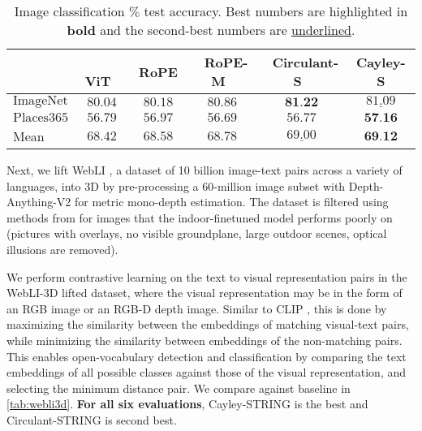 \vspace{-1mm}
\begin{table}[h]
    \centering
    \begin{tabular}{@{} l |@{}c@{} @{}c@{} @{}c@{}| @{}c@{} @{}c@{}}
    \toprule 
         & $\ $ $\ $ ViT $\ $ $\ $& $\ $ RoPE $\ $& $\ $ RoPE\textrm{-}M $\ $ & $\ $ Circulant\textrm{-}S $\ $ & $\ $ Cayley\textrm{-}S \\
         \midrule
        $\mathrm{ImageNet}$ & $80.04$ &  $80.18$ & $80.86$ & $\textbf{81.22}$ & $\underline{81.09}$ \\
        $\mathrm{Places365}$ & $56.79$ & \underline{$56.97$} & $56.69$ & $56.77$ & $\textbf{57.16}$ \\
        \midrule
        Mean & $68.42$ & $68.58$ & $68.78$ & $\underline{69.00}$ & $\textbf{69.12}$ \\
        \bottomrule
    \end{tabular}
    \caption{Image classification $\%$ test accuracy. Best numbers are highlighted in \textbf{bold} and the second-best numbers are \underline{underlined}.}
    \label{tab:img_class}
\vspace{-3mm}
\end{table}
Next, we lift \textrm{WebLI} \citep{chen2023pali}, a dataset of 10 billion image-text pairs across a variety of languages, into 3D by pre-processing a 60-million image subset with Depth-Anything-V2 \citep{yang2024depthv2} for metric mono-depth estimation.
The dataset is filtered using methods from \citep{chen2024spatialvlm} for images that the indoor-finetuned model performs poorly on (pictures with overlays, no visible groundplane, large outdoor scenes, optical illusions are removed). 

We perform contrastive learning on the text to visual representation pairs in the WebLI-3D lifted dataset, where the visual representation may be in the form of an RGB image or an RGB-D depth image.
Similar to CLIP \citep{radford2021clip}, this is done by maximizing the similarity between the embeddings of matching visual-text pairs, while minimizing the similarity between embeddings of the non-matching pairs. 
This enables open-vocabulary detection and classification by comparing the text embeddings of all possible classes against those of the visual representation, and selecting the minimum distance pair. We compare against baseline in \cref{tab:webli3d}. \textbf{For all six evaluations}, Cayley-STRING is the best and Circulant-STRING is second best.
\newpage

